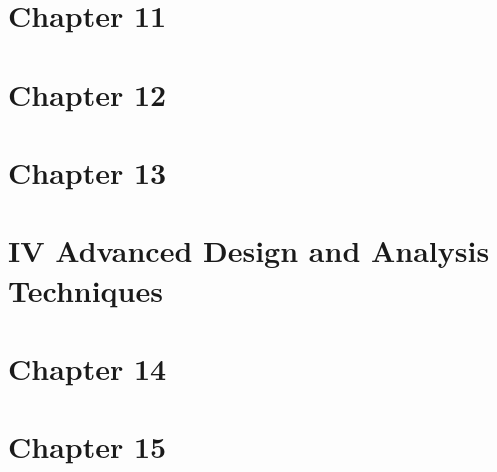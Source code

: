 \documentclass[12pt,a4paper]{article}
\begin{document}




\pagebreak


\section*{Chapter 11}






\pagebreak


\section*{Chapter 12}






\pagebreak

\section*{Chapter 13}






\pagebreak



\section*{IV Advanced Design and Analysis Techniques}
\pagebreak

\section*{Chapter 14}

\pagebreak

\section*{Chapter 15}














\pagebreak
\end{document}

